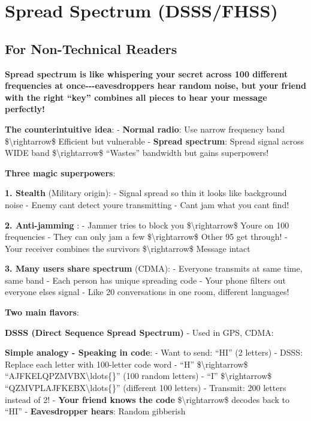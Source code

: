 \section{Spread Spectrum (DSSS/FHSS)}\label{spread-spectrum-dsssfhss}

\subsection{\texorpdfstring{ For Non-Technical
Readers}{ For Non-Technical Readers}}\label{for-non-technical-readers}

\textbf{Spread spectrum is like whispering your secret across 100
different frequencies at once-\/-\/-eavesdroppers hear random noise, but
your friend with the right ``key'' combines all pieces to hear your
message perfectly!}

\textbf{The counterintuitive idea}: - \textbf{Normal radio}: Use narrow
frequency band \$\textbackslash rightarrow\$ Efficient but vulnerable -
\textbf{Spread spectrum}: Spread signal across WIDE band
\$\textbackslash rightarrow\$ ``Wastes'' bandwidth but gains
superpowers!

\textbf{Three magic superpowers}:

\textbf{1. Stealth} (Military origin): - Signal spread so thin it looks
like background noise - Enemy can\textquotesingle t detect
you\textquotesingle re transmitting - Can\textquotesingle t jam what you
can\textquotesingle t find!

\textbf{2. Anti-jamming} : - Jammer tries to block you
\$\textbackslash rightarrow\$ You\textquotesingle re on 100 frequencies
- They can only jam a few \$\textbackslash rightarrow\$ Other 95 get
through! - Your receiver combines the survivors
\$\textbackslash rightarrow\$ Message intact

\textbf{3. Many users share spectrum} (CDMA): - Everyone transmits at
same time, same band - Each person has unique spreading code - Your
phone filters out everyone else\textquotesingle s signal - Like 20
conversations in one room, different languages!

\textbf{Two main flavors}:

\textbf{DSSS (Direct Sequence Spread Spectrum)} - Used in GPS, CDMA:

\textbf{Simple analogy - Speaking in code}: - Want to send: ``HI'' (2
letters) - DSSS: Replace each letter with 100-letter code word - ``H''
\$\textbackslash rightarrow\$ ``AJFKELQPZMVBX\textbackslash ldots\{\}''
(100 random letters) - ``I'' \$\textbackslash rightarrow\$
``QZMVPLAJFKEBX\textbackslash ldots\{\}'' (different 100 letters) -
Transmit: 200 letters instead of 2! - \textbf{Your friend knows the
code} \$\textbackslash rightarrow\$ decodes back to ``HI'' -
\textbf{Eavesdropper hears}: Random gibberish

